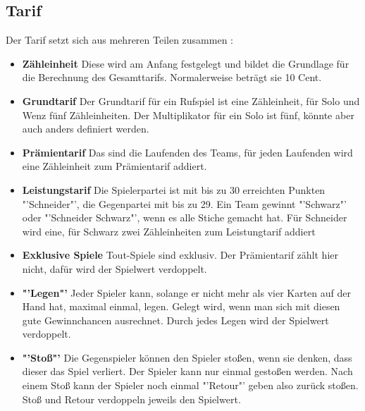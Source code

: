 \documentclass[
							a4paper, 
							11pt, 
							openany, 
							liststotoc,
							parskip=half, 
   							headings=normal
						]{scrreprt}
\begin{document}
{\clearpage

\subsection{Tarif} \label{sse:grundlagen_schafkopf_tarif}
Der Tarif setzt sich aus mehreren Teilen zusammen \cite[S.60f.]{merschbacher:schafkopf}:
\begin{itemize}
	\item \textbf{Zähleinheit}\newline
Diese wird am Anfang festgelegt und bildet die Grundlage für die Berechnung des Gesamttarifs. Normalerweise beträgt sie 10 Cent.
	\item \textbf{Grundtarif}\newline
Der Grundtarif für ein Rufspiel ist eine Zähleinheit, für Solo und Wenz fünf Zähl\-ein\-hei\-ten. Der Multiplikator für ein Solo ist fünf, könnte aber auch anders definiert werden.
	\item \textbf{Prämientarif}\newline
Das sind die Laufenden des Teams, für jeden Laufenden wird eine Zähleinheit zum Prämientarif addiert.
	\item \textbf{Leistungstarif}\newline
Die Spielerpartei ist mit bis zu 30 erreichten Punkten "'Schneider"',  die Gegenpartei mit bis zu 29. Ein Team gewinnt "'Schwarz"' oder "'Schneider Schwarz"', wenn es alle Stiche gemacht hat.
Für Schneider wird eine, für Schwarz zwei Zähleinheiten zum Leistungtarif addiert
	\item \textbf{Exklusive Spiele}\newline
Tout-Spiele sind exklusiv. Der Prämientarif zählt hier nicht, dafür wird der Spielwert verdoppelt.
	\item \textbf{"'Legen"'}\newline
Jeder Spieler kann, solange er nicht mehr als vier Karten auf der Hand hat, maximal einmal, legen.
Gelegt wird, wenn man sich mit diesen gute Gewinnchancen ausrechnet. Durch jedes Legen wird der Spielwert verdoppelt.
	\item \textbf{"'Stoß"'}\newline
Die Gegenspieler können den Spieler stoßen, wenn sie denken, dass dieser das Spiel verliert. Der Spieler kann nur einmal gestoßen werden. Nach einem Stoß kann der Spieler noch einmal "'Retour"' geben also zurück stoßen.\newline
Stoß und Retour verdoppeln jeweils den Spielwert.
\end{itemize}

}
\end{document}

